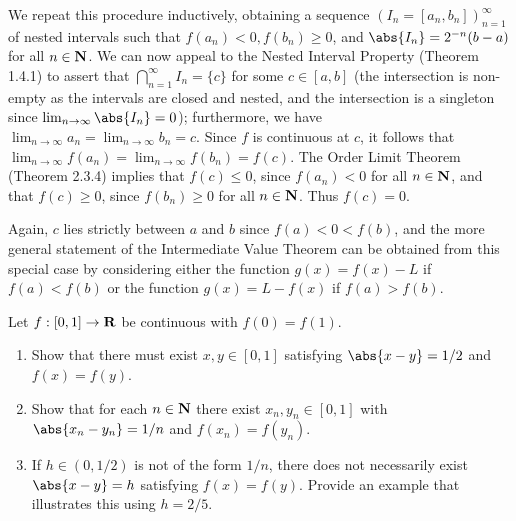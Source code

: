 \documentclass{lew98_solutions}
\begin{document}
\begin{solution}
\begin{enumerate}
        We repeat this procedure inductively, obtaining a sequence \( (I_n = [a_n, b_n])_{n=1}^{\infty} \) of nested intervals such that \( f(a_n) < 0, f(b_n) \geq 0 \), and \( \abs{I_n} = 2^{-n}(b - a) \) for all \( n \in \mathbf{N} \). We can now appeal to the Nested Interval Property (Theorem 1.4.1) to assert that \( \bigcap_{n=1}^{\infty} I_n = \{ c \} \) for some \( c \in [a, b] \) (the intersection is non-empty as the intervals are closed and nested, and the intersection is a singleton since \( \lim_{n \to \infty} \abs{I_n} = 0 \)); furthermore, we have \( \lim_{n \to \infty} a_n = \lim_{n \to \infty} b_n = c \). Since \( f \) is continuous at \( c \), it follows that \( \lim_{n \to \infty} f(a_n) = \lim_{n \to \infty} f(b_n) = f(c) \). The Order Limit Theorem (Theorem 2.3.4) implies that \( f(c) \leq 0 \), since \( f(a_n) < 0 \) for all \( n \in \mathbf{N} \), and that \( f(c) \geq 0 \), since \( f(b_n) \geq 0 \) for all \( n \in \mathbf{N} \). Thus \( f(c) = 0 \). 
        
        Again, \( c \) lies strictly between \( a \) and \( b \) since \( f(a) < 0 < f(b) \), and the more general statement of the Intermediate Value Theorem can be obtained from this special case by considering either the function \( g(x) = f(x) - L \) if \( f(a) < f(b) \) or the function \( g(x) = L - f(x) \) if \( f(a) > f(b) \).
    \end{enumerate}
\end{solution}

\begin{exercise}
\label{ex:4.5.6}
    Let \( f : [0, 1] \to \mathbf{R} \) be continuous with \( f(0) = f(1) \).
    \begin{enumerate}
        \item Show that there must exist \( x, y \in [0, 1] \) satisfying \( \abs{x - y} = 1/2 \) and \( f(x) = f(y) \).

        \item Show that for each \( n \in \mathbf{N} \) there exist \( x_n, y_n \in [0, 1] \) with \( \abs{x_n - y_n} = 1/n \) and \( f(x_n) = f(y_n) \).

        \item If \( h \in (0, 1/2) \) is not of the form \( 1/n \), there does not necessarily exist \( \abs{x - y} = h \) satisfying \( f(x) = f(y) \). Provide an example that illustrates this using \( h = 2/5 \).
    \end{enumerate}
\end{exercise}
\end{document}
